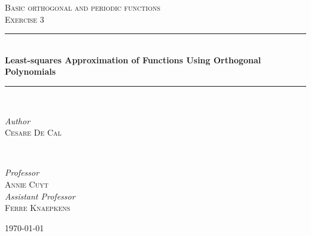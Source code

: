\documentclass{article}
\begin{document}

\begin{titlepage} %
	\newcommand{\HRule}{\rule{\linewidth}{0.5mm}}%
	
	\center %
	
	
	\textsc{\Large Basic orthogonal and periodic functions}\\[0.5cm] %
	
	\textsc{\large Exercise 3}\\[0.5cm] %
	
	
	\HRule\\[0.6cm]
	
	{\huge\bfseries Least-squares Approximation of Functions Using Orthogonal Polynomials}\\[0.25cm] %
	
	\HRule\\[1.5cm]
	
	
	\begin{minipage}{0.4\textwidth}
		\begin{flushleft}
			\large
			\textit{Author}\\
			\textsc{Cesare De Cal} %
		\end{flushleft}
	\end{minipage}
	~
	\begin{minipage}{0.4\textwidth}
		\begin{flushright}
			\large
			\textit{Professor}\\
			\textsc{Annie Cuyt}\\ %
			[0.25cm]
			\textit{Assistant Professor}\\
			\textsc{Ferre Knaepkens} %

		\end{flushright}
	\end{minipage}
		
	\vfill\vfill\vfill
	
	{\large\today}
		
	\vfill
	
\end{titlepage}
\end{document}
